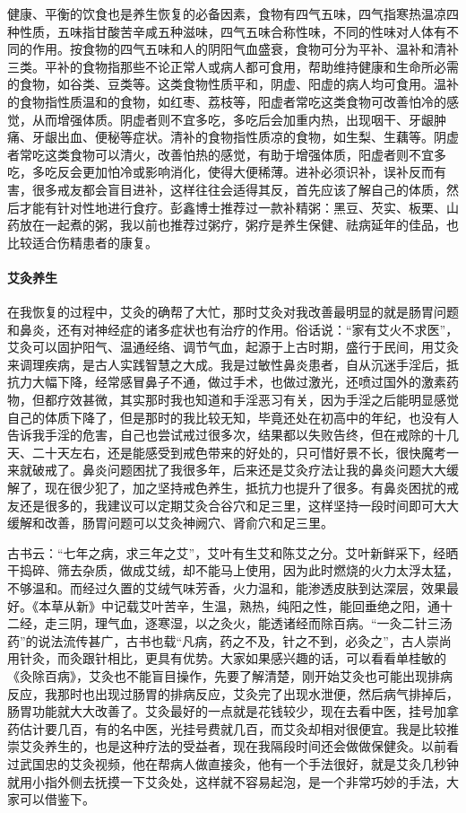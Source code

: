 健康、平衡的饮食也是养生恢复的必备因素，食物有四气五味，四气指寒热温凉四种性质，五味指甘酸苦辛咸五种滋味，四气五味合称性味，不同的性味对人体有不同的作用。按食物的四气五味和人的阴阳气血盛衰，食物可分为平补、温补和清补三类。平补的食物指那些不论正常人或病人都可食用，帮助维持健康和生命所必需的食物，如谷类、豆类等。这类食物性质平和，阴虚、阳虚的病人均可食用。温补的食物指性质温和的食物，如红枣、荔枝等，阳虚者常吃这类食物可改善怕冷的感觉，从而增强体质。阴虚者则不宜多吃，多吃后会加重内热，出现咽干、牙龈肿痛、牙龈出血、便秘等症状。清补的食物指性质凉的食物，如生梨、生藕等。阴虚者常吃这类食物可以清火，改善怕热的感觉，有助于增强体质，阳虚者则不宜多吃，多吃反会更加怕冷或影响消化，使得大便稀薄。进补必须识补，误补反而有害，很多戒友都会盲目进补，这样往往会适得其反，首先应该了解自己的体质，然后才能有针对性地进行食疗。彭鑫博士推荐过一款补精粥：黑豆、芡实、板栗、山药放在一起煮的粥，我以前也推荐过粥疗，粥疗是养生保健、祛病延年的佳品，也比较适合伤精患者的康复。

\paragraph{艾灸养生}

在我恢复的过程中，艾灸的确帮了大忙，那时艾灸对我改善最明显的就是肠胃问题和鼻炎，还有对神经症的诸多症状也有治疗的作用。俗话说：“家有艾火不求医”，艾灸可以固护阳气、温通经络、调节气血，起源于上古时期，盛行于民间，用艾灸来调理疾病，是古人实践智慧之大成。我是过敏性鼻炎患者，自从沉迷手淫后，抵抗力大幅下降，经常感冒鼻子不通，做过手术，也做过激光，还喷过国外的激素药物，但都疗效甚微，其实那时我也知道和手淫恶习有关，因为手淫之后能明显感觉自己的体质下降了，但是那时的我比较无知，毕竟还处在初高中的年纪，也没有人告诉我手淫的危害，自己也尝试戒过很多次，结果都以失败告终，但在戒除的十几天、二十天左右，还是能感受到戒色带来的好处的，只可惜好景不长，很快魔考一来就破戒了。鼻炎问题困扰了我很多年，后来还是艾灸疗法让我的鼻炎问题大大缓解了，现在很少犯了，加之坚持戒色养生，抵抗力也提升了很多。有鼻炎困扰的戒友还是很多的，我建议可以定期艾灸合谷穴和足三里，这样坚持一段时间即可大大缓解和改善，肠胃问题可以艾灸神阙穴、肾俞穴和足三里。

古书云：“七年之病，求三年之艾”，艾叶有生艾和陈艾之分。艾叶新鲜采下，经晒干捣碎、筛去杂质，做成艾绒，却不能马上使用，因为此时燃烧的火力太浮太猛，不够温和。而经过久置的艾绒气味芳香，火力温和，能渗透皮肤到达深层，效果最好。《本草从新》中记载艾叶苦辛，生温，熟热，纯阳之性，能回垂绝之阳，通十二经，走三阴，理气血，逐寒湿，以之灸火，能透诸经而除百病。“一灸二针三汤药”的说法流传甚广，古书也载“凡病，药之不及，针之不到，必灸之”，古人崇尚用针灸，而灸跟针相比，更具有优势。大家如果感兴趣的话，可以看看单桂敏的《灸除百病》，艾灸也不能盲目操作，先要了解清楚，刚开始艾灸也可能出现排病反应，我那时也出现过肠胃的排病反应，艾灸完了出现水泄便，然后病气排掉后，肠胃功能就大大改善了。艾灸最好的一点就是花钱较少，现在去看中医，挂号加拿药估计要几百，有的名中医，光挂号费就几百，而艾灸却相对很便宜。我是比较推崇艾灸养生的，也是这种疗法的受益者，现在我隔段时间还会做做保健灸。以前看过武国忠的艾灸视频，他在帮病人做直接灸，他有一个手法很好，就是艾灸几秒钟就用小指外侧去抚摸一下艾灸处，这样就不容易起泡，是一个非常巧妙的手法，大家可以借鉴下。

